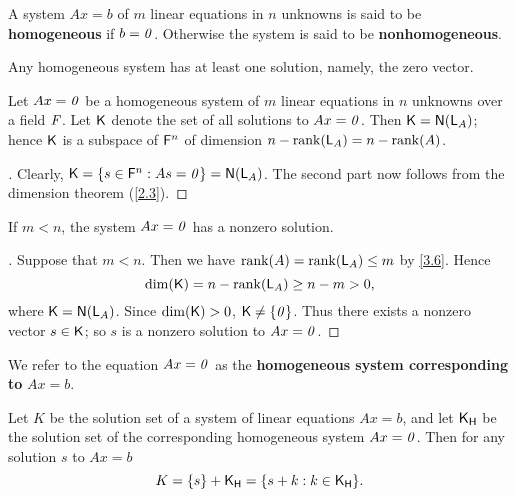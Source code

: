 \begin{defn}\label{3.3.2}
	A system \(Ax = b\) of \(m\) linear equations in \(n\) unknowns is said to be \textbf{homogeneous} if \(b = \mathit{0}\).
	Otherwise the system is said to be \textbf{nonhomogeneous}.
\end{defn}

\begin{note}
	Any homogeneous system has at least one solution, namely, the zero vector.
\end{note}

\begin{thm}\label{3.8}
	Let \(Ax = \mathit{0}\) be a homogeneous system of \(m\) linear equations in \(n\) unknowns over a field \(\mathit{F}\).
	Let \(\mathsf{K}\) denote the set of all solutions to \(Ax = \mathit{0}\).
	Then \(\vs{K} = \ns{\L_A}\);
	hence \(\mathsf{K}\) is a subspace of \(\mathsf{F}^n\) of dimension \(n - \rk{\L_A} = n - \rk{A}\).
\end{thm}

\begin{proof}[]
	Clearly, \(\vs{K} = \set{s \in \vs{F}^n : As = \zv} = \ns{\L_A}\).
	The second part now follows from the dimension theorem (\cref{2.3}).
\end{proof}

\begin{cor}\label{3.3.3}
	If \(m < n\), the system \(Ax = \mathit{0}\) has a nonzero solution.
\end{cor}

\begin{proof}[]
	Suppose that \(m < n\).
	Then we have \(\rk{A} = \rk{\L_A} \leq m\) by \cref{3.6}.
	Hence
	\[
		\dim(\vs{K}) = n - \rk{\L_A} \geq n - m > 0,
	\]
	where \(\vs{K} = \ns{\L_A}\).
	Since \(\dim(\mathsf{K}) > 0\), \(\mathsf{K} \neq \left\lbrace\mathit{0}\right\rbrace\).
	Thus there exists a nonzero vector \(s \in \mathsf{K}\);
	so \(s\) is a nonzero solution to \(Ax = \mathit{0}\).
\end{proof}

\begin{defn}\label{3.3.4}
	We refer to the equation \(Ax = \mathit{0}\) as the \textbf{homogeneous system corresponding to} \(Ax = b\).
\end{defn}

\begin{thm}\label{3.9}
	Let \(K\) be the solution set of a system of linear equations \(Ax = b\), and let \(\mathsf{K}_{\mathsf{H}}\) be the solution set of the corresponding homogeneous system \(Ax = \mathit{0}\).
	Then for any solution \(s\) to \(Ax = b\)
	\[
		K = \set{s} + \vs{K}_{\vs{H}} = \set{s + k : k \in \vs{K}_{\vs{H}}}.
	\]
\end{thm}


